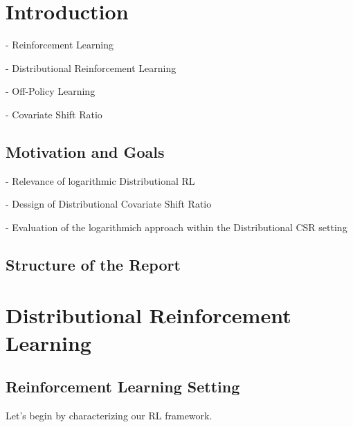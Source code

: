 \documentclass[12pt,a4paper,openright,twoside]{article}
\numberwithin{equation}{section}
\theoremstyle{definition}
\theoremstyle{remark}
\theoremstyle{plain}
\begin{document}
\pagestyle{fancy}
\renewcommand{\sectionmark}[1]{\markboth{\thesection.\quad #1}{}}
\renewcommand{\subsectionmark}[1]{\markright{\thesubsection.\quad #1}}

\setcounter{page}{1}

\thispagestyle{plain}
\section{Introduction}

- Reinforcement Learning

- Distributional Reinforcement Learning

- Off-Policy Learning

- Covariate Shift Ratio




\subsection*{Motivation and Goals}

- Relevance of logarithmic Distributional RL

- Dessign of Distributional Covariate Shift Ratio

- Evaluation of the logarithmich approach within the Distributional CSR setting


\subsection*{Structure of the Report}




\newpage


\thispagestyle{plain}
\section{Distributional Reinforcement Learning}




\subsection{Reinforcement Learning Setting}

Let's begin by characterizing our RL framework.
\end{document}
